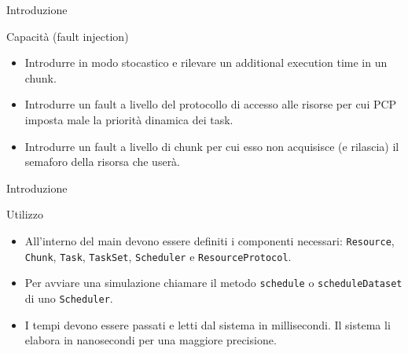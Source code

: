 \begin{frame}{Introduzione}
    \begin{block}{Capacità (fault injection)}
        \begin{itemize}
            \item Introdurre in modo stocastico e rilevare un additional execution time in un chunk.
            \item Introdurre un fault a livello del protocollo di accesso alle risorse per cui PCP imposta male la priorità dinamica dei task.
            \item Introdurre un fault a livello di chunk per cui esso non acquisisce (e rilascia) il semaforo della risorsa che userà.
        \end{itemize}
    \end{block}
\end{frame}

\begin{frame}{Introduzione}
    \begin{block}{Utilizzo}
        \begin{itemize}
            \item All'interno del main devono essere definiti i componenti necessari: \texttt{Resource}, \texttt{Chunk}, \texttt{Task}, \texttt{TaskSet}, \texttt{Scheduler} e \texttt{ResourceProtocol}.
            \item Per avviare una simulazione chiamare il metodo \texttt{schedule} o \texttt{scheduleDataset} di uno \texttt{Scheduler}.
            \item I tempi devono essere passati e letti dal sistema in millisecondi. Il sistema li elabora in nanosecondi per una maggiore precisione.
        \end{itemize}
    \end{block}
\end{frame}